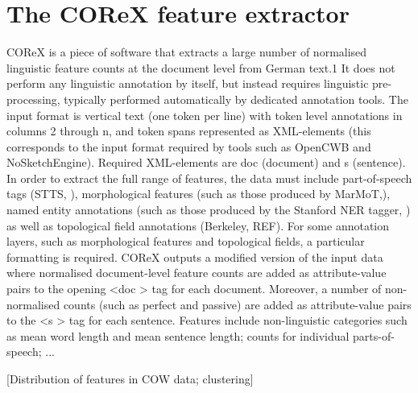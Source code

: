 \section{The COReX feature extractor}

COReX is a piece of software that extracts a large number of normalised linguistic feature counts at the document level from German text.1 It does not perform any linguistic annotation by itself, but instead requires linguistic pre-processing, typically performed automatically by dedicated annotation tools. The input format is vertical text (one token per line) with token level annotations in columns 2 through n, and token spans represented as XML-elements (this corresponds to the input format required by tools such as OpenCWB and NoSketchEngine). Required XML-elements are doc (document) and s (sentence). In order to extract the full range of features, the data must include part-of-speech tags (STTS, ), morphological features (such as those produced by MarMoT,\citealp{MuellerSchmidSchuetze2013}), named entity annotations (such as those produced by the Stanford NER tagger, \citealp{FinkelGrenagerManning2005}) as well as topological field annotations (Berkeley, REF). For some annotation layers, such as morphological features and topological fields, a particular formatting is required. COReX outputs a modified version of the input data where normalised document-level feature counts are added as attribute-value pairs to the opening <doc > tag for each document. Moreover, a number of non-normalised counts (such as perfect and passive) are added as attribute-value pairs to the <s > tag for each sentence. Features include non-linguistic categories such as mean word length and mean sentence length; counts for individual parts-of-speech; ...
 
[Distribution of features in COW data; clustering]
